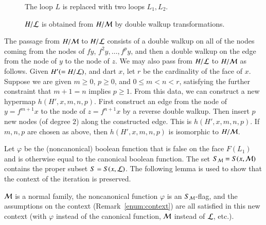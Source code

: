 \begin{figure}[htb]
  \centering
  \caption{The loop $L$ is replaced with two loops $L_1, L_2$.}
  \label{fig:L1L2}
\end{figure}

\begin{figure}[htb]
  \centering
  \caption{$H/{\cal L}$ is obtained from $H/{\cal M}$ by double walkup transformations.}
  \label{fig:L1L2dart}
\end{figure}

The passage from  $H/{\cal M}$ to $H/{\cal L}$ consists of  a double walkup on all of the nodes coming from the nodes of $f y$, $f^2 y, \ldots, f^p y$, and then a double walkup on the edge from the node of $y$ to the node of $z$.  %
We may also pass from $H/{\cal L}$ to $H/{\cal M}$ as follows.
Given $H' (= H/{\cal L})$, and dart $x$, let $r$ be the cardinality of the face of $x$.  Suppose we are given $m\ge 0$, $p\ge 0$, and $0 \le m < n < r$, satisfying the further constraint that $m+1=n$ implies $p\ge1$.  From this data, we can construct a new hypermap $h(H',x,m,n,p)$.  First construct an edge from the node of $y = f^{m+1} x$ to the node of $z = f^{n+1} x$ by a reverse double walkup.  Then insert $p$ new nodes (of degree $2$) along the constructed edge.  This is $h(H',x,m,n,p)$.  If $m,n,p$ are chosen as above, then $h(H',x,m,n,p)$ is isomorphic to $H/{\cal M}$.


Let $\varphi$ be the (noncanonical) boolean function that is false on the face $F(L_1)$ and is otherwise equal to the canonical boolean function. The set $S_{\cal M}=S(x,{\cal M})$ contains the proper subset $S=S(x,{\cal L})$.  The following lemma is used to show that the context of the iteration is preserved.

\begin{lemma}  
${\cal M}$ is a normal family, the noncanonical function $\varphi$ is an $S_{\cal M}$-flag, and the assumptions on the context (Remark~\ref{enum:context}) are all satisfied in this new context (with $\varphi$ instead of the canonical function, ${\cal M}$ instead of ${\cal L}$, etc.).
\end{lemma}


